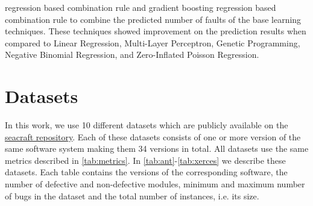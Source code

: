 \documentclass[]{article}
\begin{document}
regression based combination rule and gradient boosting regression based combination rule to combine the predicted number of faults of the base learning techniques. These techniques showed improvement on the prediction results when compared to Linear Regression, Multi-Layer Perceptron, Genetic Programming, Negative Binomial Regression, and Zero-Inflated Poisson Regression.\\
	
	
	\FloatBarrier
	\section{Datasets}
	In this work, we use 10 different datasets which are publicly available on the \href{https://zenodo.org/communities/seacraft/search?page=1&size=20&keywords=defect#}{seacraft repository}. Each of these datasets consists of one or more version of the same software system making them 34 versions in total. All datasets use the same metrics described in \autoref{tab:metrics}. In \autoref{tab:ant}-\autoref{tab:xerces} we describe these datasets. Each table contains the versions of the corresponding software, the number of defective and non-defective modules, minimum and maximum number of bugs in the dataset and the total number of instances, i.e. its size.
	
\end{document}
